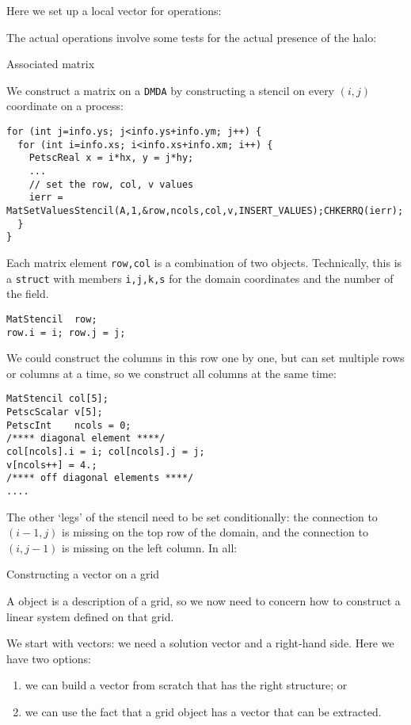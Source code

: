 Here we set up a local vector for operations:
%

The actual operations involve some tests for the actual presence of the halo:
%

 {Associated matrix}

We construct a matrix on a \lstinline{DMDA} by constructing a stencil
on every $(i,j)$ coordinate on a process:
\begin{lstlisting}
for (int j=info.ys; j<info.ys+info.ym; j++) {
  for (int i=info.xs; i<info.xs+info.xm; i++) {
    PetscReal x = i*hx, y = j*hy;
    ...
    // set the row, col, v values
    ierr = MatSetValuesStencil(A,1,&row,ncols,col,v,INSERT_VALUES);CHKERRQ(ierr);
  }
}
\end{lstlisting}

Each matrix element \lstinline{row,col}
is a combination of two  objects.
Technically, this is a \lstinline{struct} with members \lstinline{i,j,k,s}
for the domain coordinates and the number of the field.
\begin{lstlisting}
MatStencil  row;
row.i = i; row.j = j; 
\end{lstlisting}
We could construct the columns in this row one by one,
but  can set multiple rows or columns at a time,
so we construct all columns at the same time:
\begin{lstlisting}
MatStencil col[5];
PetscScalar v[5];
PetscInt    ncols = 0;
/**** diagonal element ****/
col[ncols].i = i; col[ncols].j = j;
v[ncols++] = 4.;
/**** off diagonal elements ****/
....
\end{lstlisting}

The other `legs' of the stencil need to be set conditionally:
the connection to $(i-1,j)$ is missing on the top row of the domain,
and the connection to $(i,j-1)$ is missing on the left column.
In all:
%

 {Constructing a vector on a grid}

A  object is a description of a grid,
so we now need to concern how to construct a linear system
defined on that grid.

We start with vectors: we need a solution vector
and a right-hand side.
Here we have two options:
\begin{enumerate}
\item we can build a vector from scratch that has the right structure; or
\item we can use the fact that a grid object has a vector that can be extracted.
\end{enumerate}

